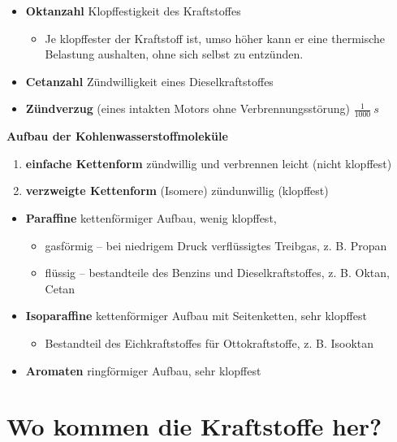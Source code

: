 \begin{itemize}
\item
  \textbf{Oktanzahl} Klopffestigkeit des Kraftstoffes

  \begin{itemize}
  \item
    Je klopffester der Kraftstoff ist, umso höher kann er eine
    thermische Belastung aushalten, ohne sich selbst zu entzünden.
  \end{itemize}
\item
  \textbf{Cetanzahl} Zündwilligkeit eines Dieselkraftstoffes
\item
  \textbf{Zündverzug} (eines intakten Motors ohne Verbrennungsstörung)
  $\frac{1}{1000}~s$
\end{itemize}

\textbf{Aufbau der Kohlenwasserstoffmoleküle}

\begin{enumerate}
\item
  \textbf{einfache Kettenform} zündwillig und verbrennen leicht (nicht
  klopffest)
\item
  \textbf{verzweigte Kettenform} (Isomere) zündunwillig (klopffest)
\end{enumerate}

\begin{itemize}
\item
  \textbf{Paraffine} kettenförmiger Aufbau, wenig klopffest,

  \begin{itemize}
  \item
    gasförmig -- bei niedrigem Druck verflüssigtes Treibgas, z. B.
    Propan
  \item
    flüssig -- bestandteile des Benzins und Dieselkraftstoffes, z. B.
    Oktan, Cetan
  \end{itemize}
\item
  \textbf{Isoparaffine} kettenförmiger Aufbau mit Seitenketten, sehr
  klopffest

  \begin{itemize}
  \item
    Bestandteil des Eichkraftstoffes für Ottokraftstoffe, z. B. Isooktan
  \end{itemize}
\item
  \textbf{Aromaten} ringförmiger Aufbau, sehr klopffest
\end{itemize}

\section{Wo kommen die Kraftstoffe
her?}\label{wo-kommen-die-kraftstoffe-her}

